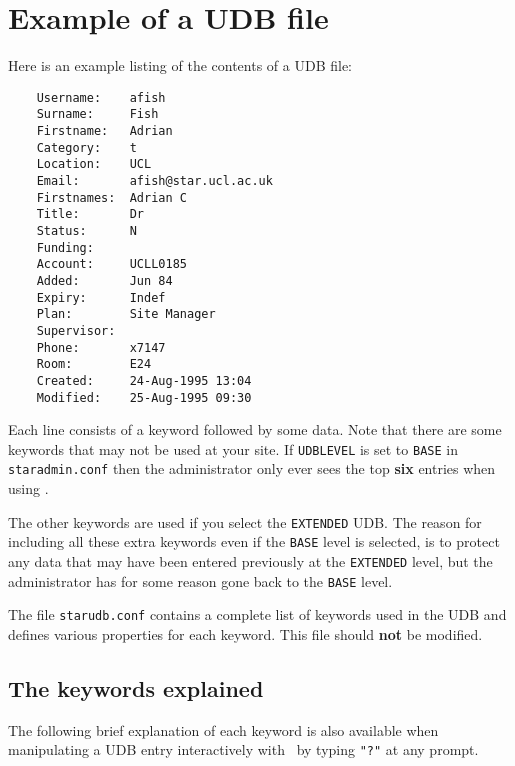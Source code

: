 \section{Example of a UDB file}

Here is an example listing of the contents of a UDB file:

\begin{verbatim}
    Username:    afish
    Surname:     Fish
    Firstname:   Adrian
    Category:    t
    Location:    UCL
    Email:       afish@star.ucl.ac.uk
    Firstnames:  Adrian C
    Title:       Dr
    Status:      N
    Funding:     
    Account:     UCLL0185
    Added:       Jun 84
    Expiry:      Indef
    Plan:        Site Manager
    Supervisor:  
    Phone:       x7147
    Room:        E24
    Created:     24-Aug-1995 13:04
    Modified:    25-Aug-1995 09:30
\end{verbatim}

Each line consists of a keyword followed by some data.
Note that there are some keywords that may not be used at your site.
If {\tt UDBLEVEL} is set to {\tt BASE} in {\tt staradmin.conf} then 
the administrator only ever sees the top {\bf six} entries when using 
\staradmin.

The other keywords are used if you select the {\tt EXTENDED} UDB.
The reason for including all these extra keywords even if the {\tt BASE} 
level is selected, is to protect any data that may have been entered 
previously at the {\tt EXTENDED} level, but the administrator has for some 
reason gone back to the {\tt BASE} level.

The file {\tt starudb.conf} contains a complete list of keywords used in the
UDB and defines various properties for each keyword. This file should 
{\bf not} be modified.

\subsection{The keywords explained}

The following brief explanation of each keyword is also available when
manipulating a UDB entry interactively with \staradmin\ by typing {\tt "?"} at
any prompt.

